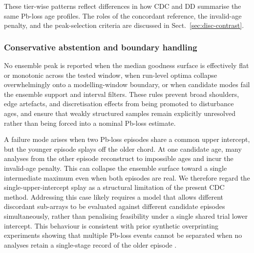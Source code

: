 These tier-wise patterns reflect differences in how CDC and DD summarise the same Pb-loss age profiles. The roles of the concordant reference, the invalid-age penalty, and the peak-selection criteria are discussed in Sect.~\ref{sec:disc-contrast}.

\subsubsection{Conservative abstention and boundary handling}
No ensemble peak is reported when the median goodness surface is effectively flat or monotonic across the tested window, when run-level optima collapse overwhelmingly onto a modelling-window boundary, or when candidate modes fail the ensemble support and interval filters. These rules prevent broad shoulders, edge artefacts, and discretisation effects from being promoted to disturbance ages, and ensure that weakly structured samples remain explicitly unresolved rather than being forced into a nominal Pb-loss estimate.

A failure mode arises when two Pb-loss episodes share a common upper intercept, but the younger episode splays off the older chord. At one candidate age, many analyses from the other episode reconstruct to impossible ages and incur the invalid-age penalty. This can collapse the ensemble surface toward a single intermediate maximum even when both episodes are real. We therefore regard the single-upper-intercept splay as a structural limitation of the present CDC method. Addressing this case likely requires a model that allows different discordant sub-arrays to be evaluated against different candidate episodes simultaneously, rather than penalising feasibility under a single shared trial lower intercept. This behaviour is consistent with prior synthetic overprinting experiments showing that multiple Pb-loss events cannot be separated when no analyses retain a single-stage record of the older episode \citep{Kirkland2020}.

